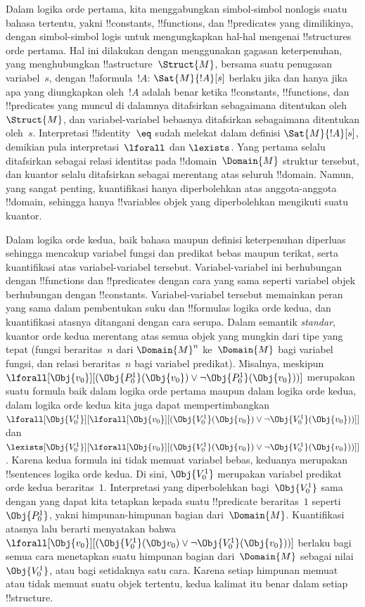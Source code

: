 \documentclass[../../../include/open-logic-section]{subfiles}
\begin{document}


Dalam logika orde pertama, kita menggabungkan simbol-simbol nonlogis suatu
bahasa tertentu, yakni !!{constant}s, !!{function}s, dan !!{predicate}s yang
dimilikinya, dengan simbol-simbol logis untuk mengungkapkan hal-hal mengenai
!!{structure}s orde pertama. Hal ini dilakukan dengan menggunakan gagasan
keterpenuhan, yang menghubungkan !!a{structure}~$\Struct{M}$, bersama suatu
penugasan variabel~$s$, dengan !!a{formula}~$!A$: $\Sat{M}{!A}[s]$ berlaku jika
dan hanya jika apa yang diungkapkan oleh~$!A$ adalah benar ketika
!!{constant}s, !!{function}s, dan !!{predicate}s yang muncul di dalamnya
ditafsirkan sebagaimana ditentukan oleh~$\Struct{M}$, dan variabel-variabel
bebasnya ditafsirkan sebagaimana ditentukan oleh~$s$. Interpretasi
!!{identity}~$\eq$ sudah melekat
dalam definisi $\Sat{M}{!A}[s]$, demikian pula interpretasi~$\lforall$ dan
$\lexists$. Yang pertama selalu ditafsirkan sebagai relasi identitas pada
!!{domain}~$\Domain{M}$ struktur tersebut, dan kuantor selalu ditafsirkan
sebagai merentang atas seluruh !!{domain}. Namun, yang sangat penting,
kuantifikasi hanya diperbolehkan atas anggota-anggota !!{domain}, sehingga
hanya !!{variable}s objek yang diperbolehkan mengikuti suatu kuantor.

Dalam logika orde kedua, baik bahasa maupun definisi keterpenuhan diperluas
sehingga mencakup variabel fungsi dan predikat bebas maupun terikat, serta
kuantifikasi atas variabel-variabel tersebut. Variabel-variabel ini
berhubungan dengan !!{function}s dan !!{predicate}s dengan cara yang sama
seperti variabel objek berhubungan dengan !!{constant}s. Variabel-variabel
tersebut memainkan peran yang sama dalam pembentukan suku dan !!{formula}s
logika orde kedua, dan kuantifikasi atasnya ditangani dengan cara serupa.
Dalam semantik \emph{standar}, kuantor orde kedua merentang atas semua objek
yang mungkin dari tipe yang tepat (fungsi beraritas~$n$ dari $\Domain{M}^n$
ke~$\Domain{M}$ bagi variabel fungsi, dan relasi beraritas~$n$ bagi variabel
predikat). Misalnya, meskipun
$\lforall[\Obj{v_0}][(\Obj{P^1_0}(\Obj{v_0}) \lor \lnot
  \Obj{P^1_0}(\Obj{v_0}))]$ merupakan suatu formula baik dalam logika orde
pertama maupun dalam logika orde kedua, dalam logika orde kedua kita juga
dapat mempertimbangkan
$\lforall[\Obj{V^1_0}][\lforall[\Obj{v_0}][(\Obj{V^1_0}(\Obj{v_0}) \lor
    \lnot \Obj{V^1_0}(\Obj{v_0}))]]$ dan
$\lexists[\Obj{V^1_0}][\lforall[\Obj{v_0}][(\Obj{V^1_0}(\Obj{v_0}) \lor
    \lnot \Obj{V^1_0}(\Obj{v_0}))]]$. Karena kedua formula ini tidak memuat
variabel bebas, keduanya merupakan !!{sentence}s logika orde kedua. Di sini,
$\Obj{V^1_0}$ merupakan variabel predikat orde kedua beraritas~$1$.
Interpretasi yang diperbolehkan bagi~$\Obj{V^1_0}$ sama dengan yang dapat kita
tetapkan kepada suatu !!{predicate} beraritas~$1$ seperti~$\Obj{P^1_0}$, yakni
himpunan-himpunan bagian dari~$\Domain{M}$. Kuantifikasi atasnya lalu berarti
menyatakan bahwa
$\lforall[\Obj{v_0}][(\Obj{V^1_0}(\Obj v_0) \lor \lnot
  \Obj{V^1_0}(\Obj{v_0}))]$ berlaku bagi semua cara menetapkan suatu himpunan
bagian dari~$\Domain{M}$ sebagai nilai~$\Obj{V^1_0}$, atau bagi setidaknya satu
cara. Karena setiap himpunan memuat atau tidak memuat suatu objek tertentu,
kedua kalimat itu benar dalam setiap !!{structure}.
\end{document}
